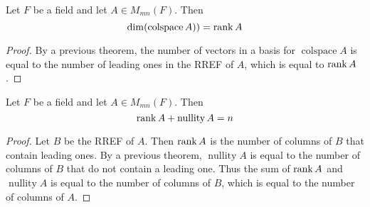 \documentclass{article}
\DeclareMathOperator{\nullity}{nullity}
\DeclareMathOperator{\colspace}{colspace}
\begin{document}
  \begin{theorem}
    Let $F$ be a field and let $A \in M_{mn}(F)$. Then
    \[
    \dim(\colspace A)) = \rank A
  \]
\end{theorem}
\begin{proof}
  By a previous theorem, the number of vectors in a basis for $\colspace A$ is equal to the number of leading ones in the RREF of $A$, which is equal to $\rank A$.
\end{proof}
\begin{cthm}
  Let $F$ be a field and let $A \in M_{mn}(F)$. Then \[
    \rank A + \nullity A = n
  \]
\end{cthm}
\begin{proof}
  Let $B$ be the RREF of $A$. Then $\rank A$ is the number of columns of $B$ that contain leading ones. By a previous theorem, $\nullity A$ is equal to the number of columns of $B$ that do not contain a leading one. Thus the sum of $\rank A$ and $\nullity A$ is equal to the number of columns of $B$, which is equal to the number of columns of $A$.
\end{proof}
\end{document}
